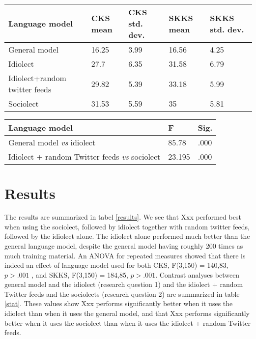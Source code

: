 \documentclass[11pt]{article}
\begin{document}
\begin{table*}[t]

\begin{tabular}{l|llll}
Language model&CKS mean&CKS std. dev.&SKKS mean&SKKS std. dev.\\
\hline
General model&16.25&3.99&16.56&4.25\\
Idiolect&27.7&6.35&31.58&6.79\\
Idiolect+random twitter feeds&29.82&5.39&33.18&5.99\\
Sociolect&31.53&5.59&35&5.81\\
\end{tabular}
\caption{The percentage of keystrokes saved with four different language models}
\label{results}
\end{table*}

\begin{table*}[t]

\begin{tabular}{l|ll}
Language model&F&Sig.\\
\hline
General model \emph{vs} idiolect&85.78&.000\\
Idiolect + random Twitter feeds \emph{vs} sociolect&23.195&.000\\
\end{tabular}

\caption{F-values for and significance values for the contrasts important for research question 1 and 2.}
\label{stat}
\end{table*}


\section{Results}

The results are summarized in tabel \ref{results}. We see that Xxx performed best when using the sociolect, followed by idiolect together with random twitter feeds, followed by the idiolect alone. The idiolect alone performed much better than the general language model, despite the general model having roughly 200 times as much training material. An ANOVA for repeated measures showed that there is indeed an effect of language model used for both CKS, F(3,150) = 140,83, $p > .001$ , and SKKS, F(3,150) = 184,85, $p > .001$. Contrast analyses between general model and the idiolect (research question 1) and the idiolect + random Twitter feeds and the sociolects (research question 2) are summarized in table \ref{stat}. These values show Xxx performs significantly better when it uses the idiolect than when it uses the general model, and that Xxx performs significantly better when it uses the sociolect than when it uses the idiolect + random Twitter feeds.
\end{document}
